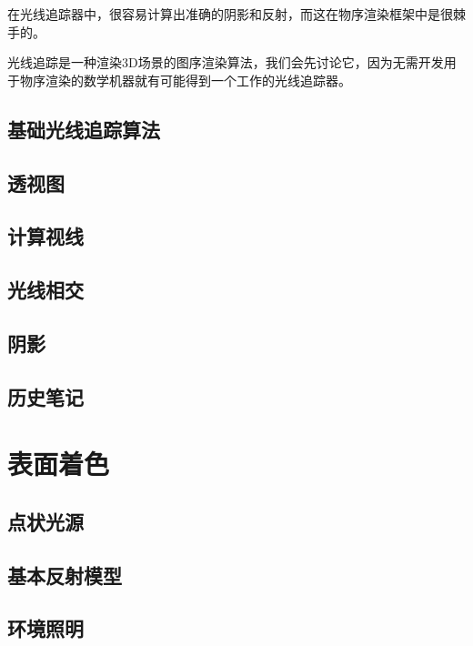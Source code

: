 \documentclass[lang=cn,12pt]{elegantbook}
\begin{document}
\begin{note}
  在光线追踪器中，很容易计算出准确的阴影和反射，而这在物序渲染框架中是很棘手的。
\end{note}

光线追踪是一种渲染3D场景的图序渲染算法，我们会先讨论它，因为无需开发用于物序渲染的数学机器就有可能得到一个工作的光线追踪器。

\section{基础光线追踪算法}



\section{透视图}

\section{计算视线}

\section{光线相交}

\section{阴影}

\section{历史笔记}

\chapter{表面着色}

\section{点状光源}


\section{基本反射模型}


\section{环境照明}
\end{document}
